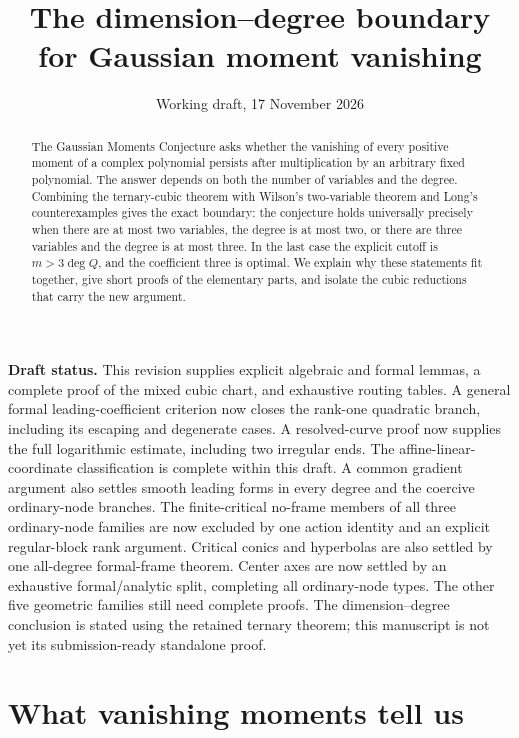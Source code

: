 \documentclass[11pt]{article}
\title{The dimension--degree boundary\\for Gaussian moment vanishing}
\author{}
\date{Working draft, 17 November 2026}
\theoremstyle{definition}\newtheorem{definition}[theorem]{Definition}
\theoremstyle{remark}\newtheorem{remark}[theorem]{Remark}
\begin{document}
\maketitle
\begin{center}\begin{minipage}{0.91\textwidth}\small
\textbf{Draft status.} This revision supplies explicit algebraic and formal
lemmas, a complete proof of the mixed cubic chart, and exhaustive routing
tables. A general formal leading-coefficient criterion now closes the
rank-one quadratic branch, including its escaping and degenerate cases.
A resolved-curve proof now supplies the full logarithmic estimate,
including two irregular ends. The affine-linear-coordinate classification
is complete within this draft. A common gradient argument also settles
smooth leading forms in every degree and the coercive ordinary-node
branches. The finite-critical no-frame members of all three ordinary-node
families are now excluded by one action identity and an explicit
regular-block rank argument. Critical conics and hyperbolas are also settled by one all-degree
formal-frame theorem. Center axes are now settled by an exhaustive formal/analytic split,
completing all ordinary-node types. The other five geometric
families still need complete proofs. The
dimension--degree conclusion is stated using the retained ternary theorem;
this manuscript is not yet its submission-ready standalone proof.
\end{minipage}\end{center}

\begin{abstract}
The Gaussian Moments Conjecture asks whether the vanishing of every
positive moment of a complex polynomial persists after multiplication by
an arbitrary fixed polynomial. The answer depends on both the number of
variables and the degree. Combining the ternary-cubic theorem with
Wilson's two-variable theorem and Long's counterexamples gives the exact
boundary: the conjecture holds universally precisely when there are at
most two variables, the degree is at most two, or there are three variables
and the degree is at most three. In the last case the explicit cutoff is
$m>3\deg Q$, and the coefficient three is optimal. We explain why these
statements fit together, give short proofs of the elementary parts, and
isolate the cubic reductions that carry the new argument.
\end{abstract}

\section{What vanishing moments tell us}
\end{document}

